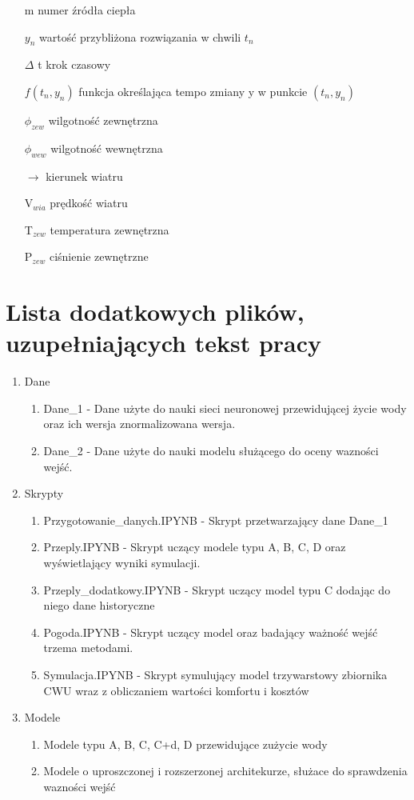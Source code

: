 \documentclass[a4paper,twoside,12pt]{book}
\begin{document}
\begin{appendices}
\begin{itemize}
    \item[m] numer źródła ciepła
    \item[$y_n$] wartość przybliżona rozwiązania w chwili $t_n$
    \item[$\Delta$ t] krok czasowy
    \item[$f(t_n, y_n)$] funkcja określająca tempo zmiany y w punkcie $(t_n, y_n)$
    \item[$\phi_{zew}$] wilgotność zewnętrzna
    \item[$\phi_{wew}$] wilgotność wewnętrzna
    \item[$\longrightarrow$] kierunek wiatru
    \item[V$_{wia}$] prędkość wiatru
    \item[T$_{zew}$] temperatura zewnętrzna
    \item[P$_{zew}$] ciśnienie zewnętrzne
  \end{itemize}



  \chapter{Lista dodatkowych plików, uzupełniających tekst pracy}

  \begin{enumerate}
    \item Dane
          \begin{enumerate}
            \item Dane\_1 - Dane użyte do nauki sieci neuronowej przewidującej życie wody oraz ich wersja znormalizowana wersja.
            \item Dane\_2 - Dane użyte do nauki modelu służącego do oceny wazności wejść.
          \end{enumerate}
    \item Skrypty
          \begin{enumerate}
            \item Przygotowanie\_danych.IPYNB - Skrypt przetwarzający dane Dane\_1
            \item Przeply.IPYNB - Skrypt uczący modele typu A, B, C, D oraz wyświetlający wyniki symulacji.
            \item Przeply\_dodatkowy.IPYNB - Skrypt uczący model typu C dodając do niego dane historyczne
            \item Pogoda.IPYNB - Skrypt uczący model oraz badający ważność wejść trzema metodami.
            \item Symulacja.IPYNB - Skrypt symulujący model trzywarstowy zbiornika CWU wraz z obliczaniem wartości komfortu i kosztów
          \end{enumerate}
    \item Modele
          \begin{enumerate}
            \item Modele typu A, B, C, C+d, D przewidujące zużycie wody
            \item Modele o uproszczonej i rozszerzonej architekurze, służace do sprawdzenia wazności wejść
          \end{enumerate}
  \end{enumerate}




\end{appendices}
\end{document}
